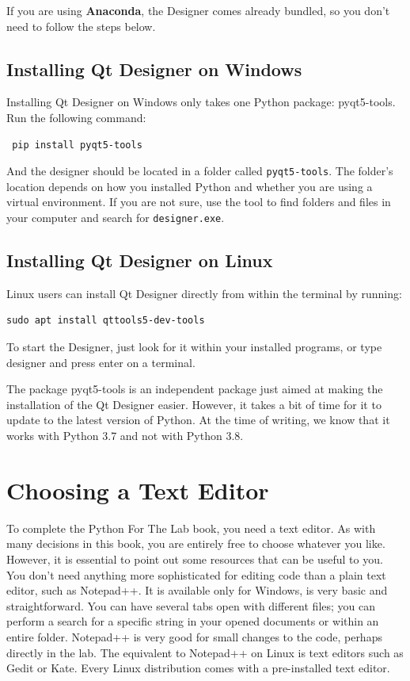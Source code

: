 If you are using \textbf{Anaconda}, the Designer comes already bundled, so you don't need to follow the steps below.

\subsection{Installing Qt Designer on Windows}\label{subsec:installing-on-windows}
Installing Qt Designer on Windows only takes one Python package: pyqt5-tools. Run the following command:

\begin{verbatim}
 pip install pyqt5-tools
\end{verbatim}

\sloppy And the designer should be located in a folder called \texttt{pyqt5-tools}. The folder's location depends on how you installed Python and whether you are using a virtual environment. If you are not sure, use the tool to find folders and files in your computer and search for \texttt{designer.exe}.

\subsection{Installing Qt Designer on Linux}\label{subsec:installing-on-linux}
Linux users can install Qt Designer directly from within the terminal by running:

\begin{verbatim}
sudo apt install qttools5-dev-tools
\end{verbatim}

To start the Designer, just look for it within your installed programs, or type designer and press enter on a terminal.

The package pyqt5-tools is an independent package just aimed at making the installation of the Qt Designer easier. However, it takes a bit of time for it to update to the latest version of Python. At the time of writing, we know that it works with Python 3.7 and not with Python 3.8.

\section{Choosing a Text Editor}\label{sec:editors}
To complete the Python For The Lab book, you need a text editor. As with many decisions in this book, you are entirely free to choose whatever you like. However, it is essential to point out some resources that can be useful to you. You don't need anything more sophisticated for editing code than a plain text editor, such as Notepad++. It is available only for Windows, is very basic and straightforward. You can have several tabs open with different files; you can perform a search for a specific string in your opened documents or within an entire folder. Notepad++ is very good for small changes to the code, perhaps directly in the lab. The equivalent to Notepad++ on Linux is text editors such as Gedit or Kate. Every Linux distribution comes with a pre-installed text editor.

